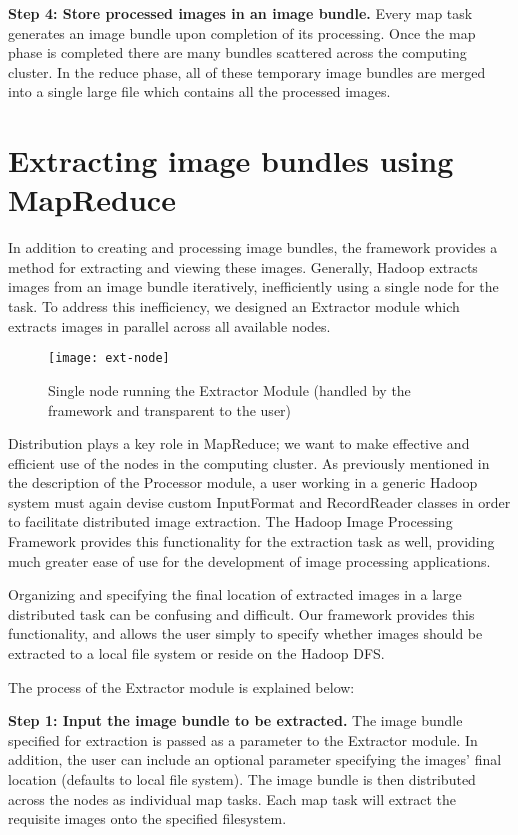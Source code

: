 \textbf{Step 4: Store processed images in an image bundle.} Every map
task generates an image bundle upon completion of its processing.
Once the map phase is completed there are many bundles scattered
across the computing cluster.  In the reduce phase, all of these
temporary image bundles are merged into a single large file which
contains all the processed images.


\section{Extracting image bundles using MapReduce}
In addition to creating and processing image bundles, the framework
provides a method for extracting and viewing these images.  Generally,
Hadoop extracts images from an image bundle iteratively, inefficiently
using a single node for the task. To address this inefficiency, we
designed an Extractor module which extracts images in parallel across
all available nodes.
\begin{figure}[h]
	\centering
	\texttt{[image: ext-node]}
	\caption{Single node running the Extractor Module (handled by the
		framework and transparent to the user)}
	\label{fig:ext-node}
\end{figure}
Distribution plays a key role in MapReduce; we want to make effective
and efficient use of the nodes in the computing cluster.  As
previously mentioned in the description of the Processor module, a
user working in a generic Hadoop system must again devise custom
InputFormat and RecordReader classes in order to facilitate
distributed image extraction.  The Hadoop Image Processing Framework
provides this functionality for the extraction task as well, providing
much greater ease of use for the development of image processing
applications.

Organizing and specifying the final location of extracted images in a
large distributed task can be confusing and difficult.  Our framework
provides this functionality, and allows the user simply to specify
whether images should be extracted to a local file system or reside on
the Hadoop DFS.

The process of the Extractor module is explained below:

\textbf{Step 1: Input the image bundle to be extracted.} The image
bundle specified for extraction is passed as a parameter to the
Extractor module.  In addition, the user can include an optional
parameter specifying the images' final location (defaults to local
file system).  The image bundle is then distributed across the nodes
as individual map tasks. Each map task will extract the requisite
images onto the specified filesystem.

